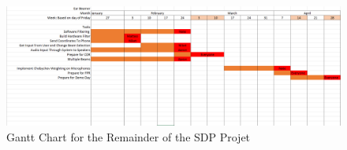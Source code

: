\documentclass[10pt,journal,compsoc]{IEEEtran}
\begin{document}
\thispagestyle{empty}
\begin{landscape}
\begin{figure}[]
    \label{fig:schedule}
    \centering
    \includegraphics[scale=0.38]{schedule}
    \caption{Gantt Chart for the Remainder of the SDP Projet}
\end{figure}
\end{landscape}




\ifCLASSOPTIONcaptionsoff
  \newpage
\fi






%







\end{document}
